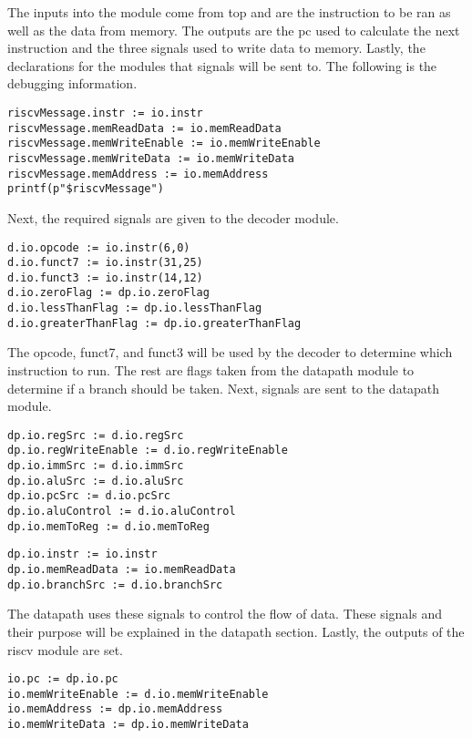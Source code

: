 \documentclass[12pt, letterpaper]{report}
\begin{document}
\noindent The inputs into the module come from top and are the instruction to be ran as well as the data from memory. The outputs are the pc used to calculate the next instruction and the three signals used to write data to memory. Lastly, the declarations for the modules that signals will be sent to. The following is the debugging information.

\begin{lstlisting}[style=scala]
riscvMessage.instr := io.instr
riscvMessage.memReadData := io.memReadData
riscvMessage.memWriteEnable := io.memWriteEnable
riscvMessage.memWriteData := io.memWriteData
riscvMessage.memAddress := io.memAddress
printf(p"$riscvMessage")
\end{lstlisting}

\noindent Next, the required signals are given to the decoder module.

\begin{lstlisting}[style=scala]
d.io.opcode := io.instr(6,0)
d.io.funct7 := io.instr(31,25)
d.io.funct3 := io.instr(14,12)
d.io.zeroFlag := dp.io.zeroFlag
d.io.lessThanFlag := dp.io.lessThanFlag
d.io.greaterThanFlag := dp.io.greaterThanFlag
\end{lstlisting}

\noindent The opcode, funct7, and funct3 will be used by the decoder to determine which instruction to run. The rest are flags taken from the datapath module to determine if a branch should be taken. Next, signals are sent to the datapath module. 

\begin{lstlisting}[style=scala]
dp.io.regSrc := d.io.regSrc
dp.io.regWriteEnable := d.io.regWriteEnable
dp.io.immSrc := d.io.immSrc
dp.io.aluSrc := d.io.aluSrc
dp.io.pcSrc := d.io.pcSrc
dp.io.aluControl := d.io.aluControl
dp.io.memToReg := d.io.memToReg
\end{lstlisting}
\noindent\begin{lstlisting}[style=scala]
dp.io.instr := io.instr
dp.io.memReadData := io.memReadData
dp.io.branchSrc := d.io.branchSrc
\end{lstlisting}

\noindent The datapath uses these signals to control the flow of data. These signals and their purpose will be explained in the datapath section. Lastly, the outputs of the riscv module are set.

\begin{lstlisting}[style=scala]
io.pc := dp.io.pc
io.memWriteEnable := d.io.memWriteEnable
io.memAddress := dp.io.memAddress
io.memWriteData := dp.io.memWriteData
\end{lstlisting}
\end{document}
